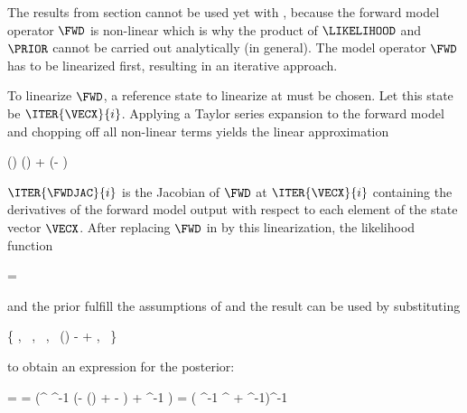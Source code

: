     The results from section  cannot be used yet with
    , because the forward model operator $\FWD$ is
    non-linear which is why the product of $\LIKELIHOOD$ and $\PRIOR$ cannot
    be carried out analytically (in general). 
    The model operator $\FWD$ has to be linearized first, resulting in an
    iterative approach.

\startsubsection[title=Iterative Solutions]

    To linearize $\FWD$, a reference state to linearize at must be chosen.
    Let this state be $\ITER{\VECX}{i}$. Applying a Taylor series
    expansion to the forward model and chopping off all non-linear
    terms yields the linear approximation

    \startformula
        \FWD(\VECX) \approx \FWD()
            +  (\VECX - ) \EQSTOP
    \stopformula

    $\ITER{\FWDJAC}{i}$ is the Jacobian of $\FWD$ at $\ITER{\VECX}{i}$
    containing the derivatives of the forward model output with respect to each
    element of the state vector $\VECX$. After replacing $\FWD$ in
     by this linearization, the likelihood function

    \startformula
        \LIKELIHOOD = 
    \stopformula

    and the prior  fulfill the assumptions of
     and the result  can be used by
    substituting

    \startformula
        \{ \VECA \rightarrow \MEANVECA,~
        \MATPI \rightarrow \COVMATA,~
        \MATB \rightarrow {},~
        \VECB \rightarrow \FWD()
            -  
            + \MEANVECERR,~
        \MATQI \rightarrow \COVMATERR \}
    \stopformula

    to obtain an expression for the posterior:
    
    \startformula
    \startalign[n=2,align={right,left}]
        \NC \POSTERIOR = \NC \GAUSS{\VECX}{\MEANVEC}{\COVMAT} \EQCOMMA \NR
        \NC \MEANVEC = \NC \COVMAT (^\top
            \COVMATERR^{-1} (\VECY - \FWD()
            +   - \MEANVECERR)
            + \COVMATA^{-1} \MEANVECA) \EQCOMMA \NR
        \NC \COVMAT = \NC 
            ( \COVMATERR^{-1} ^\top
            + \COVMATA^{-1})^{-1} \EQSTOP \NR
    \stopalign
    \stopformula
    

